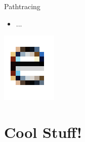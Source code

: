 \documentclass{lug}
\newcommand{\splitslide}[4]{
    \noindent
    \begin{minipage}{#1 \textwidth - #2 }
        #3
    \end{minipage}%
    \hspace{ \dimexpr #2 * 2 \relax }%
    \begin{minipage}{\textwidth - #1 \textwidth - #2 }
        #4
    \end{minipage}
}
\begin{document}
\begin{frame}{Pathtracing}
    \splitslide{0.65}{.7em}{
        \small
        \begin{itemize}
            \item ...
        \end{itemize}
    }{
        \includegraphics[width=\textwidth]{graphics/subpixel_e}
    }
    \noindent
\end{frame}

\section{Cool Stuff!}
\end{document}
